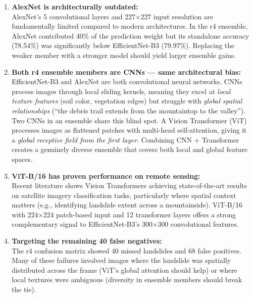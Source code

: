 \documentclass[11pt]{article}
\begin{document}
\begin{enumerate}
    \item \textbf{AlexNet is architecturally outdated:}\\
          AlexNet's 5 convolutional layers and 227$\times$227 input resolution are fundamentally limited compared to modern architectures. In the r4 ensemble, AlexNet contributed 40\% of the prediction weight but its standalone accuracy (78.54\%) was significantly below EfficientNet-B3 (79.97\%). Replacing the weaker member with a stronger model should yield larger ensemble gains.

    \item \textbf{Both r4 ensemble members are CNNs --- same architectural bias:}\\
          EfficientNet-B3 and AlexNet are both convolutional neural networks. CNNs process images through local sliding kernels, meaning they excel at \textit{local texture features} (soil color, vegetation edges) but struggle with \textit{global spatial relationships} (``the debris trail extends from the mountaintop to the valley''). Two CNNs in an ensemble share this blind spot. A Vision Transformer (ViT) processes images as flattened patches with multi-head self-attention, giving it a \textit{global receptive field from the first layer}. Combining CNN + Transformer creates a genuinely diverse ensemble that covers both local and global feature spaces.

    \item \textbf{ViT-B/16 has proven performance on remote sensing:}\\
          Recent literature shows Vision Transformers achieving state-of-the-art results on satellite imagery classification tasks, particularly where spatial context matters (e.g., identifying landslide extent across a mountainside). ViT-B/16 with 224$\times$224 patch-based input and 12 transformer layers offers a strong complementary signal to EfficientNet-B3's 300$\times$300 convolutional features.

    \item \textbf{Targeting the remaining 40 false negatives:}\\
          The r4 confusion matrix showed 40 missed landslides and 68 false positives. Many of these failures involved images where the landslide was spatially distributed across the frame (ViT's global attention should help) or where local textures were ambiguous (diversity in ensemble members should break the tie).
\end{enumerate}
\end{document}
